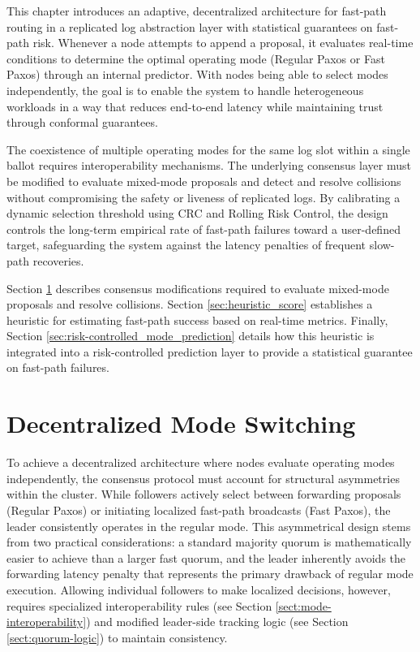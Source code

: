 
This chapter introduces an adaptive, decentralized architecture for fast-path routing in a replicated log abstraction layer with statistical guarantees on fast-path risk. Whenever a node attempts to append a proposal, it evaluates real-time conditions to determine the optimal operating mode (Regular Paxos or Fast Paxos) through an internal predictor. With nodes being able to select modes independently, the goal is to enable the system to handle heterogeneous workloads in a way that reduces end-to-end latency while maintaining trust through conformal guarantees.

The coexistence of multiple operating modes for the same log slot within a single ballot requires interoperability mechanisms. The underlying consensus layer must be modified to evaluate mixed-mode proposals and detect and resolve collisions without compromising the safety or liveness of replicated logs. By calibrating a dynamic selection threshold using \gls{CRC} and Rolling Risk Control, the design controls the long-term empirical rate of fast-path failures toward a user-defined target, safeguarding the system against the latency penalties of frequent slow-path recoveries.

Section \ref{sec:decentralized_mode_switching} describes consensus modifications required to evaluate mixed-mode proposals and resolve collisions. Section \ref{sec:heuristic_score} establishes a heuristic for estimating fast-path success based on real-time metrics. Finally, Section \ref{sec:risk-controlled_mode_prediction} details how this heuristic is integrated into a risk-controlled prediction layer to provide a statistical guarantee on fast-path failures.

\section{Decentralized Mode Switching}
\label{sec:decentralized_mode_switching}
To achieve a decentralized architecture where nodes evaluate operating modes independently, the consensus protocol must account for structural asymmetries within the cluster. While followers actively select between forwarding proposals (Regular Paxos) or initiating localized fast-path broadcasts (Fast Paxos), the leader consistently operates in the regular mode. This asymmetrical design stems from two practical considerations: a standard majority quorum is mathematically easier to achieve than a larger fast quorum, and the leader inherently avoids the forwarding latency penalty that represents the primary drawback of regular mode execution. Allowing individual followers to make localized decisions, however, requires specialized interoperability rules (see Section \ref{sect:mode-interoperability}) and modified leader-side tracking logic (see Section \ref{sect:quorum-logic}) to maintain consistency.

